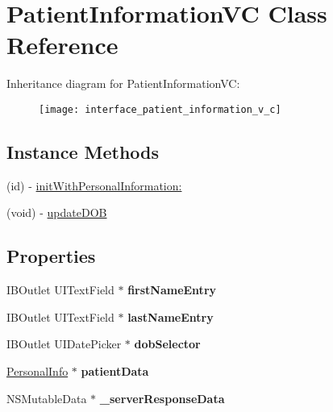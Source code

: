 \hypertarget{interface_patient_information_v_c}{\section{Patient\-Information\-V\-C Class Reference}
\label{interface_patient_information_v_c}
}
Inheritance diagram for Patient\-Information\-V\-C\-:\begin{figure}[H]
\begin{center}
\leavevmode
\texttt{[image: interface\_patient\_information\_v\_c]}
\end{center}
\end{figure}
\subsection*{Instance Methods}
\begin{DoxyCompactItemize}
\item 
(id) -\/ \hyperlink{interface_patient_information_v_c_ab98d9f44b4ee1c4b3051c017ebdac5c5}{init\-With\-Personal\-Information\-:}
\item 
(void) -\/ \hyperlink{interface_patient_information_v_c_ab6fee07f4777f557711e819c9a4cf3a4}{update\-D\-O\-B}
\end{DoxyCompactItemize}
\subsection*{Properties}
\begin{DoxyCompactItemize}
\item 
\hypertarget{interface_patient_information_v_c_a1836a8d8dc5e1a376109fb8b391c4038}{I\-B\-Outlet U\-I\-Text\-Field $\ast$ {\bfseries first\-Name\-Entry}}\label{interface_patient_information_v_c_a1836a8d8dc5e1a376109fb8b391c4038}

\item 
\hypertarget{interface_patient_information_v_c_a6523689959d35fa22fe3e01838ada93c}{I\-B\-Outlet U\-I\-Text\-Field $\ast$ {\bfseries last\-Name\-Entry}}\label{interface_patient_information_v_c_a6523689959d35fa22fe3e01838ada93c}

\item 
\hypertarget{interface_patient_information_v_c_a939dda6df517b4b5a4624928c77fe5b8}{I\-B\-Outlet U\-I\-Date\-Picker $\ast$ {\bfseries dob\-Selector}}\label{interface_patient_information_v_c_a939dda6df517b4b5a4624928c77fe5b8}

\item 
\hypertarget{interface_patient_information_v_c_afef82a462fd797cc833f72f3b33d9b3c}{\hyperlink{interface_personal_info}{Personal\-Info} $\ast$ {\bfseries patient\-Data}}\label{interface_patient_information_v_c_afef82a462fd797cc833f72f3b33d9b3c}

\item 
\hypertarget{interface_patient_information_v_c_a17cd9e90386e04e545017658bf34582e}{N\-S\-Mutable\-Data $\ast$ {\bfseries \-\_\-server\-Response\-Data}}\label{interface_patient_information_v_c_a17cd9e90386e04e545017658bf34582e}

\end{DoxyCompactItemize}



